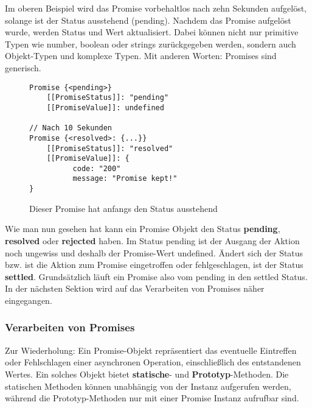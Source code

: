 \noindent
Im oberen Beispiel wird das Promise vorbehaltlos nach zehn Sekunden aufgelöst, solange ist der Status ausstehend (pending). Nachdem das Promise aufgelöst wurde, werden Status und Wert aktualisiert. Dabei können nicht nur primitive Typen wie number, boolean oder strings zurückgegeben werden, sondern auch Objekt-Typen und komplexe Typen. Mit anderen Worten: Promises sind generisch.

\begin{figure}[H]
\begin{lstlisting}
Promise {<pending>}
    [[PromiseStatus]]: "pending"
    [[PromiseValue]]: undefined
    
// Nach 10 Sekunden
Promise {<resolved>: {...}}
    [[PromiseStatus]]: "resolved"
    [[PromiseValue]]: {
          code: "200"
          message: "Promise kept!"
}
\end{lstlisting}
\caption{Dieser Promise hat anfangs den Status \glqq{}ausstehend\grqq{}}
\end{figure}

\noindent
Wie man nun gesehen hat kann ein Promise Objekt den Status \textbf{pending}, \textbf{resolved} oder \textbf{rejected} haben. Im Status pending ist der Ausgang der Aktion noch ungewiss und deshalb der Promise-Wert undefined. Ändert sich der Status bzw. ist die Aktion zum Promise eingetroffen oder fehlgeschlagen, ist der Status \textbf{settled}. Grundsätzlich läuft ein Promise also vom pending in den settled Status. In der nächsten Sektion wird auf das Verarbeiten von Promises näher eingegangen.

\subsubsection{Verarbeiten von Promises}

Zur Wiederholung: Ein Promise-Objekt repräsentiert das eventuelle Eintreffen oder Fehlschlagen einer asynchronen Operation, einschließlich des entstandenen Wertes. Ein solches Objekt bietet \textbf{statische}- und \textbf{Prototyp}-Methoden. Die statischen Methoden können unabhängig von der Instanz aufgerufen werden, während die Prototyp-Methoden nur mit einer Promise Instanz aufrufbar sind.

